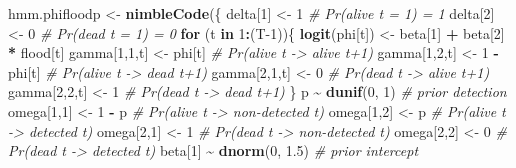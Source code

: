 \documentclass[
  12pt,
]{krantz}
\newenvironment{Shaded}{\begin{snugshade}}{\end{snugshade}}
\newcommand{\CommentTok}[1]{\textcolor[rgb]{0.56,0.35,0.01}{\textit{#1}}}
\newcommand{\ControlFlowTok}[1]{\textcolor[rgb]{0.13,0.29,0.53}{\textbf{#1}}}
\newcommand{\DecValTok}[1]{\textcolor[rgb]{0.00,0.00,0.81}{#1}}
\newcommand{\FloatTok}[1]{\textcolor[rgb]{0.00,0.00,0.81}{#1}}
\newcommand{\FunctionTok}[1]{\textcolor[rgb]{0.13,0.29,0.53}{\textbf{#1}}}
\newcommand{\NormalTok}[1]{#1}
\newcommand{\OtherTok}[1]{\textcolor[rgb]{0.56,0.35,0.01}{#1}}
\newcommand{\SpecialCharTok}[1]{\textcolor[rgb]{0.81,0.36,0.00}{\textbf{#1}}}
\begin{document}
\begin{Shaded}
\begin{Highlighting}[]
\NormalTok{hmm.phifloodp }\OtherTok{\textless{}{-}} \FunctionTok{nimbleCode}\NormalTok{(\{}
\NormalTok{  delta[}\DecValTok{1}\NormalTok{] }\OtherTok{\textless{}{-}} \DecValTok{1}          \CommentTok{\# Pr(alive t = 1) = 1}
\NormalTok{  delta[}\DecValTok{2}\NormalTok{] }\OtherTok{\textless{}{-}} \DecValTok{0}          \CommentTok{\# Pr(dead t = 1) = 0}
  \ControlFlowTok{for}\NormalTok{ (t }\ControlFlowTok{in} \DecValTok{1}\SpecialCharTok{:}\NormalTok{(T}\DecValTok{{-}1}\NormalTok{))\{}
    \FunctionTok{logit}\NormalTok{(phi[t]) }\OtherTok{\textless{}{-}}\NormalTok{ beta[}\DecValTok{1}\NormalTok{] }\SpecialCharTok{+}\NormalTok{ beta[}\DecValTok{2}\NormalTok{] }\SpecialCharTok{*}\NormalTok{ flood[t]}
\NormalTok{    gamma[}\DecValTok{1}\NormalTok{,}\DecValTok{1}\NormalTok{,t] }\OtherTok{\textless{}{-}}\NormalTok{ phi[t]      }\CommentTok{\# Pr(alive t {-}\textgreater{} alive t+1)}
\NormalTok{    gamma[}\DecValTok{1}\NormalTok{,}\DecValTok{2}\NormalTok{,t] }\OtherTok{\textless{}{-}} \DecValTok{1} \SpecialCharTok{{-}}\NormalTok{ phi[t]  }\CommentTok{\# Pr(alive t {-}\textgreater{} dead t+1)}
\NormalTok{    gamma[}\DecValTok{2}\NormalTok{,}\DecValTok{1}\NormalTok{,t] }\OtherTok{\textless{}{-}} \DecValTok{0}        \CommentTok{\# Pr(dead t {-}\textgreater{} alive t+1)}
\NormalTok{    gamma[}\DecValTok{2}\NormalTok{,}\DecValTok{2}\NormalTok{,t] }\OtherTok{\textless{}{-}} \DecValTok{1}        \CommentTok{\# Pr(dead t {-}\textgreater{} dead t+1)}
\NormalTok{  \}}
\NormalTok{  p }\SpecialCharTok{\textasciitilde{}} \FunctionTok{dunif}\NormalTok{(}\DecValTok{0}\NormalTok{, }\DecValTok{1}\NormalTok{) }\CommentTok{\# prior detection}
\NormalTok{  omega[}\DecValTok{1}\NormalTok{,}\DecValTok{1}\NormalTok{] }\OtherTok{\textless{}{-}} \DecValTok{1} \SpecialCharTok{{-}}\NormalTok{ p    }\CommentTok{\# Pr(alive t {-}\textgreater{} non{-}detected t)}
\NormalTok{  omega[}\DecValTok{1}\NormalTok{,}\DecValTok{2}\NormalTok{] }\OtherTok{\textless{}{-}}\NormalTok{ p        }\CommentTok{\# Pr(alive t {-}\textgreater{} detected t)}
\NormalTok{  omega[}\DecValTok{2}\NormalTok{,}\DecValTok{1}\NormalTok{] }\OtherTok{\textless{}{-}} \DecValTok{1}        \CommentTok{\# Pr(dead t {-}\textgreater{} non{-}detected t)}
\NormalTok{  omega[}\DecValTok{2}\NormalTok{,}\DecValTok{2}\NormalTok{] }\OtherTok{\textless{}{-}} \DecValTok{0}        \CommentTok{\# Pr(dead t {-}\textgreater{} detected t)}
\NormalTok{  beta[}\DecValTok{1}\NormalTok{] }\SpecialCharTok{\textasciitilde{}} \FunctionTok{dnorm}\NormalTok{(}\DecValTok{0}\NormalTok{, }\FloatTok{1.5}\NormalTok{) }\CommentTok{\# prior intercept}

\end{Highlighting}
\end{Shaded}
\end{document}
